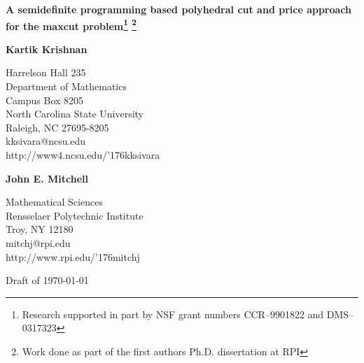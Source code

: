 \documentclass[12pt]{article}
\newcommand{\til}{\char '176}
\begin{document}
\begin{titlepage}
\begin{center}
{\bf\Large\bf A semidefinite programming based polyhedral cut and
price approach for the maxcut problem\footnote{Research supported
in part by NSF grant numbers CCR--9901822 and DMS--0317323}
\footnote{Work done as part of the first authors Ph.D.
dissertation at RPI}}
\end{center}


\begin{center}
{\bf\large\bf Kartik Krishnan}


  Harrelson Hall 235  \\
     Department of Mathematics  \\
     Campus Box 8205  \\
     North Carolina State University  \\
     Raleigh, NC 27695-8205  \\
     kksivara@ncsu.edu  \\
     http://www4.ncsu.edu/\til kksivara
     
\vspace{\baselineskip}

{\bf\large\bf John E. Mitchell}


    Mathematical Sciences  \\
    Rensselaer Polytechnic Institute  \\
    Troy,  NY 12180  \\
    mitchj@rpi.edu  \\
    http://www.rpi.edu/\til mitchj

\end{center}

\begin{center}
    Draft of \today
\end{center}

\begin{abstract}
We investigate solution of the maximum cut problem using a
polyhedral cut and price approach. The dual of the well-known SDP
relaxation of maxcut is formulated as a semi-infinite linear
programming problem, which is solved within an interior point
cutting plane algorithm in a dual setting; this constitutes the
pricing (column generation) phase of the algorithm. Cutting planes
based on the polyhedral theory of the maxcut problem are then
added to the primal problem in order to improve the SDP
relaxation; this is the cutting phase of the algorithm. We provide
computational results, and compare these results with a standard
SDP cutting plane scheme.
\begin{flushleft}
{\bf Keywords:} Semidefinite programming, column generation,
cutting plane methods, combinatorial optimization
\end{flushleft}
\end{abstract}

\end{titlepage}
\end{document}
